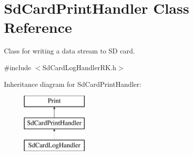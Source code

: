 \hypertarget{class_sd_card_print_handler}{}\section{Sd\+Card\+Print\+Handler Class Reference}
\label{class_sd_card_print_handler}


Class for writing a data stream to SD card.  




{\ttfamily \#include $<$Sd\+Card\+Log\+Handler\+R\+K.\+h$>$}

Inheritance diagram for Sd\+Card\+Print\+Handler\+:\begin{figure}[H]
\begin{center}
\leavevmode
\includegraphics[height=3.000000cm]{class_sd_card_print_handler}
\end{center}
\end{figure}

